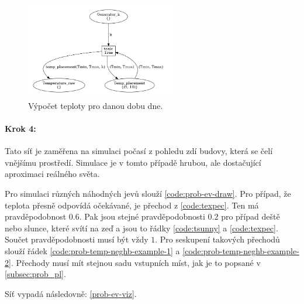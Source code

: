 \begin{figure}[htb]
 \centering
 \includegraphics[width=0.6\textwidth]{obrazky-figures/calc.png}
 \caption{Výpočet teploty pro danou dobu dne.}
 \label{therm-calc-viz}
\end{figure}

\paragraph{Krok 4:}

Tato síť je zaměřena na simulaci počasí z pohledu zdí budovy, která se čelí vnějšímu prostředí. Simulace je v tomto případě hrubou, ale dostačující aproximaci reálného světa.

Pro simulaci různých náhodných jevů slouží \ref{code:prob-ev-draw}. Pro případ, že teplota přesně odpovídá očekávané, je přechod  z \ref{code:texpec}. Ten má pravděpodobnost $0.6$. Pak jsou stejné pravděpodobnosti $0.2$ pro případ deště nebo slunce, které svítí na zeď a jsou to řádky \ref{code:tsunny} a \ref{code:texpec}. Součet pravděpodobnosti musí být vždy $1$. Pro seskupení takových přechodů slouží řádek \ref{code:prob-temp-neghb-example-1} a \ref{code:prob-temp-neghb-example-2}. Přechody musí mít stejnou sadu vstupních míst, jak je to popsané v \ref{subsec:prob_pl}.

Síť vypadá následovně: \ref{prob-ev-viz}.

